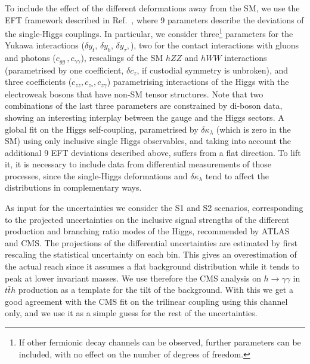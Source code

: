To include the effect of the different deformations away from the SM, we use the EFT framework described in Ref.~\cite{DiVita:2017eyz}, where 9 parameters describe the deviations of the single-Higgs couplings. In particular, we consider three\footnote{If other fermionic decay channels can be observed, further parameters can be included, with no effect on the number of degrees of freedom.} parameters for the Yukawa interactions ($\delta y_t,\,\delta y_b,\,\delta y_\tau,$), two for the contact interactions with gluons and photons ($c_{gg}\,,c_{\gamma\gamma}$), rescalings of the SM $hZZ$ and $hWW$ interactions (parametrised by one coefficient, $\delta c_z$, if custodial symmetry is unbroken), and three coefficients ($c_{zz},c_{z\square},c_{z\gamma}$) parametrising interactions of the Higgs with the electroweak bosons that have non-SM tensor structures. Note that two combinations of the last three parameters are constrained by di-boson data, showing an interesting interplay between the gauge and the Higgs sectors. A global fit on the Higgs self-coupling, parametrised by $\delta\kappa_\lambda$ (which is zero in the SM) using only inclusive single Higgs observables, and taking into account the additional 9 EFT deviations described above, suffers from a flat direction. To lift it, it is necessary to include data from differential measurements of those processes, since the single-Higgs deformations and $\delta\kappa_\lambda$ tend to affect the distributions in complementary ways.
\medskip

As input for the uncertainties we consider the S1 and S2 scenarios, corresponding to the projected uncertainties on the inclusive signal strengths of the different production and branching ratio modes of the Higgs, recommended by ATLAS and CMS. The projections of the differential uncertainties are estimated by first rescaling the statistical uncertainty on each bin. This gives an overestimation of the actual reach since it assumes a flat background distribution while it tends to peak at lower invariant masses. We use therefore the CMS analysis on $h\to \gamma \gamma$ in $t\bar{t} h$ production as a template for the tilt of the background. With this we get a good agreement with the CMS fit on the trilinear coupling using this channel only, and we use it as a simple guess for the rest of the uncertainties.
\medskip

